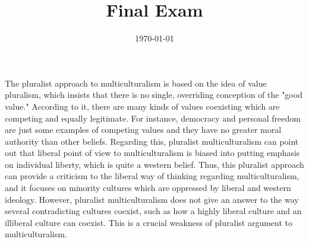 \documentclass{homework}
\title{Final Exam}
\date{\today}
\begin{document}
\maketitle



The pluralist approach to multiculturalism is based on the idea of value pluralism, which insists that there is no single, overriding conception of the "good value." According to it, there are many kinds of values coexisting which are competing and equally legitimate. For instance, democracy and personal freedom are just some examples of competing values and they have no greater moral authority than other beliefs. Regarding this, pluralist multiculturalism can point out that liberal point of view to multiculturalism is biased into putting emphasis on individual liberty, which is quite a western belief. Thus, this pluralist approach can provide a criticism to the liberal way of thinking regarding multiculturalism, and it focuses on minority cultures which are oppressed by liberal and western ideology. However, pluralist multiculturalism does not give an answer to the way several contradicting cultures coexist, such as how a highly liberal culture and an illiberal culture can coexist. This is a crucial weakness of pluralist argument to multiculturalism.

\newpage

\end{document}
